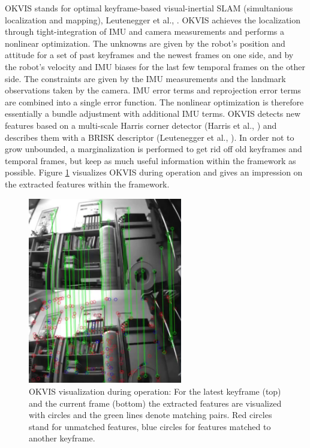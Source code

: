 OKVIS stands for optimal keyframe-based visual-inertial SLAM (simultanious localization and mapping), Leutenegger et al., \cite{leutenegger2015keyframe}. OKVIS achieves the localization through tight-integration of IMU and camera measurements and performs a nonlinear optimization. The unknowns are given by the robot's position and attitude for a set of past keyframes and the newest frames on one side, and by the robot's velocity and IMU biases for the last few temporal frames on the other side. The constraints are given by the IMU measurements and the landmark observations taken by the camera. IMU error terms and reprojection error terms are combined into a single error function. The nonlinear optimization is therefore essentially a bundle adjustment with additional IMU terms. OKVIS detects new features based on a multi-scale Harris corner detector (Harris et al., \cite{harris1988combined}) and describes them with a BRISK descriptor (Leutenegger et al., \cite{leutenegger2011brisk}). In order not to grow unbounded, a marginalization is performed to get rid off old keyframes and temporal frames, but keep as much useful information within the framework as possible. Figure \ref{pics:okvis_frontend} visualizes OKVIS during operation and gives an impression on the extracted features within the framework.

\begin{figure}[h]
   \centering
   \includegraphics[width=0.6\textwidth]{images/okvis_frontend.png}
   \caption{OKVIS visualization during operation: For the latest keyframe (top) and the current frame (bottom) the extracted features are visualized with circles and the green lines denote matching pairs. Red circles stand for unmatched features, blue circles for features matched to another keyframe.}
   \label{pics:okvis_frontend}
\end{figure}


